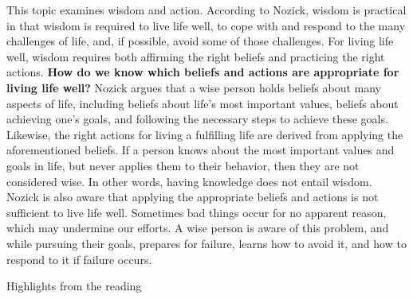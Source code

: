 \documentclass[
]{book}
\begin{document}
This topic examines wisdom and action. According to Nozick, wisdom is practical in that wisdom is required to live life well, to cope with and respond to the many challenges of life, and, if possible, avoid some of those challenges. For living life well, wisdom requires both affirming the right beliefs and practicing the right actions. \textbf{How do we know which beliefs and actions are appropriate for living life well?} Nozick argues that a wise person holds beliefs about many aspects of life, including beliefs about life's most important values, beliefs about achieving one's goals, and following the necessary steps to achieve these goals. Likewise, the right actions for living a fulfilling life are derived from applying the aforementioned beliefs. If a person knows about the most important values and goals in life, but never applies them to their behavior, then they are not considered wise. In other words, having knowledge does not entail wisdom. Nozick is also aware that applying the appropriate beliefs and actions is not sufficient to live life well. Sometimes bad things occur for no apparent reason, which may undermine our efforts. A wise person is aware of this problem, and while pursuing their goals, prepares for failure, learns how to avoid it, and how to respond to it if failure occurs.

Highlights from the reading
\end{document}
